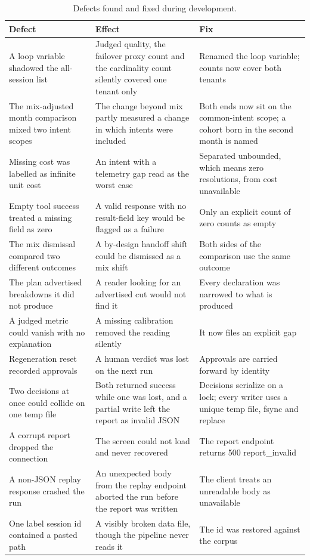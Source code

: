 \documentclass[8pt,twocolumn,a4paper]{extarticle}
\begin{document}
\begin{table}[t]
\centering
\caption{Defects found and fixed during development.}
\label{tab:defects}
\small
\begin{tabular}{p{}p{}p{}}
\toprule
\textbf{Defect} & \textbf{Effect} & \textbf{Fix} \\
\midrule
A loop variable shadowed the all-session list & Judged quality, the failover proxy count and the cardinality count silently covered one tenant only & Renamed the loop variable; counts now cover both tenants \\
The mix-adjusted month comparison mixed two intent scopes & The change beyond mix partly measured a change in which intents were included & Both ends now sit on the common-intent scope; a cohort born in the second month is named \\
Missing cost was labelled as infinite unit cost & An intent with a telemetry gap read as the worst case & Separated unbounded, which means zero resolutions, from cost unavailable \\
Empty tool success treated a missing field as zero & A valid response with no result-field key would be flagged as a failure & Only an explicit count of zero counts as empty \\
The mix dismissal compared two different outcomes & A by-design handoff shift could be dismissed as a mix shift & Both sides of the comparison use the same outcome \\
The plan advertised breakdowns it did not produce & A reader looking for an advertised cut would not find it & Every declaration was narrowed to what is produced \\
A judged metric could vanish with no explanation & A missing calibration removed the reading silently & It now files an explicit gap \\
Regeneration reset recorded approvals & A human verdict was lost on the next run & Approvals are carried forward by identity \\
Two decisions at once could collide on one temp file & Both returned success while one was lost, and a partial write left the report as invalid JSON & Decisions serialize on a lock; every writer uses a unique temp file, fsync and replace \\
A corrupt report dropped the connection & The screen could not load and never recovered & The report endpoint returns 500 report\_invalid \\
A non-JSON replay response crashed the run & An unexpected body from the replay endpoint aborted the run before the report was written & The client treats an unreadable body as unavailable \\
One label session id contained a pasted path & A visibly broken data file, though the pipeline never reads it & The id was restored against the corpus \\
\bottomrule
\end{tabular}
\end{table}
\end{document}
